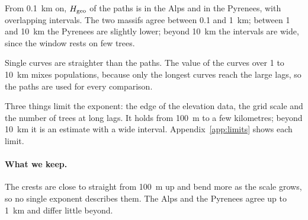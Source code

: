 From 0.1~km on, $H_{\mathrm{geo}}$ of the paths is \CgAlpsPathsFrom{} in the Alps and \CgPyrPathsFrom{} in the Pyrenees, with
overlapping intervals. The two massifs agree between 0.1 and 1~km; between 1 and 10~km the Pyrenees are slightly lower; beyond
10~km the intervals are wide, since the window rests on few trees.

Single curves are straighter than the paths. The value of the curves over 1 to 10~km mixes populations, because only the
longest curves reach the large lags, so the paths are used for every comparison.

Three things limit the exponent: the edge of the elevation data, the grid scale and the number of trees at long lags. It holds
from 100~m to a few kilometres; beyond 10~km it is an estimate with a wide interval. Appendix~\ref{app:limits} shows each limit.

\paragraph{What we keep.} The crests are close to straight from 100~m up and bend more as the scale grows, so no single
exponent describes them. The Alps and the Pyrenees agree up to 1~km and differ little beyond.
